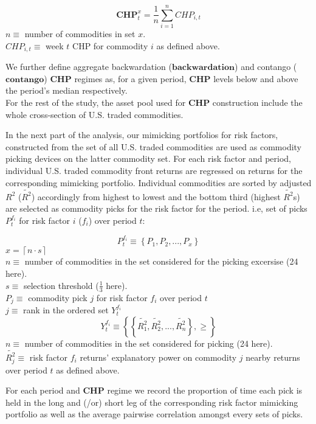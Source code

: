 \documentclass[11pt, letterpaper, doublespacing]{article}
\begin{document}
\[\mathbf{CHP}_{t}^{x}=\frac{1}{n}\sum_{i=1}^{n}CHP_{i,t}\] \(n\equiv\)
number of commodities in set \(x\).\\
\(CHP_{i,t}\equiv\) week \(t\) CHP for commodity \(i\) as defined above.

We further define aggregate backwardation (\(\mathbf{backwardation}\))
and contango (\(\mathbf{contango}\)) \(\mathbf{CHP}\) regimes as, for a
given period, \(\mathbf{CHP}\) levels below and above the period's
median respectively.\\
For the rest of the study, the asset pool used for \(\mathbf{CHP}\)
construction include the whole cross-section of U.S. traded commodities.

In the next part of the analysis, our mimicking portfolios for risk
factors, constructed from the set of all U.S. traded commodities are
used as commodity picking devices on the latter commodity set. For each
risk factor and period, individual U.S. traded commodity front returns
are regressed on returns for the corresponding mimicking portfolio.
Individual commodities are sorted by adjusted \(R^{2}\)
(\(\tilde{R^{2}}\)) accordingly from highest to lowest and the bottom
third (highest \(\tilde{R^{2}}\)s) are selected as commodity picks for
the risk factor for the period. i.e, set of picks \(P_{t}^{f_{i}}\) for
risk factor \(i\) (\(f_{i}\)) over period \(t\):

\[P_{t}^{f_{i}}\equiv\left \{ P_{1}, P_{2}, ..., P_{x} \right \}\]
\(x = \left \lceil n \cdot s \right \rceil\)\\
\(n\equiv\) number of commodities in the set considered for the picking
excersise (24 here).\\
\(s\equiv\) selection threshold (\(\frac{1}{3}\) here).\\
\(P_{j}\equiv\) commodity pick \(j\) for risk factor \(f_{i}\) over
period \(t\)\\
\(j\equiv\) rank in the ordered set \(Y_{t}^{f_{i}}\)\\
\[Y_{t}^{f_{i}}\equiv\left \{ \left \{ \tilde{R_{1}^{2}}, \tilde{R_{2}^{2}}, ..., \tilde{R_{n}^{2}} \right \}, \geq \right \}\]
\(n\equiv\) number of commodities in the set considered for picking (24
here).\\
\(\tilde{R_{j}^{2}}\equiv\) risk factor \(f_{i}\) returns' explanatory
power on commodity \(j\) nearby returns over period \(t\) as defined
above.

For each period and \(\mathbf{CHP}\) regime we record the proportion of
time each pick is held in the long and (/or) short leg of the
corresponding risk factor mimicking portfolio as well as the average
pairwise correlation amongst every sets of picks.
\end{document}
